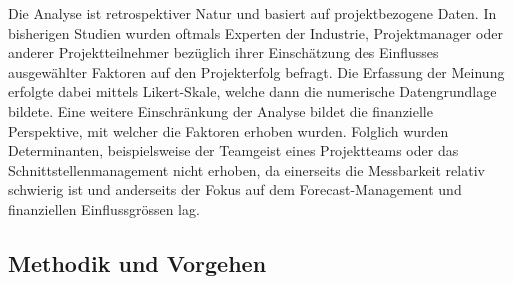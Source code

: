 \newline\newline
Die Analyse ist retrospektiver Natur und basiert auf projektbezogene Daten. In bisherigen Studien wurden oftmals Experten der Industrie, Projektmanager oder anderer Projektteilnehmer bezüglich ihrer Einschätzung des Einflusses ausgewählter Faktoren auf den Projekterfolg befragt. Die Erfassung der Meinung erfolgte dabei mittels Likert-Skale, welche dann die numerische Datengrundlage bildete. Eine weitere Einschränkung der Analyse bildet die finanzielle Perspektive, mit welcher die Faktoren erhoben wurden. Folglich wurden Determinanten, beispielsweise der Teamgeist eines Projektteams oder das Schnittstellenmanagement nicht erhoben, da einerseits die Messbarkeit relativ schwierig ist und anderseits der Fokus auf dem Forecast-Management und finanziellen Einflussgrössen lag. 
\subsection{Methodik und Vorgehen}
	

	




